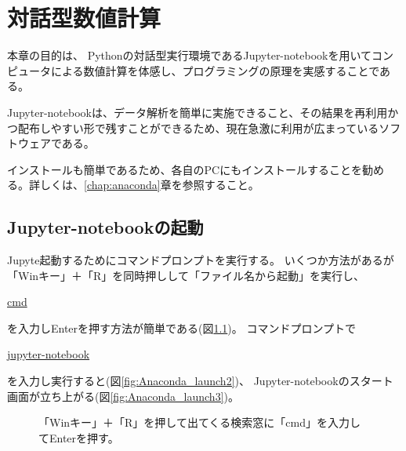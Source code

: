 \chapter{対話型数値計算}

本章の目的は、
Pythonの対話型実行環境であるJupyter-notebookを用いてコンピュータによる数値計算を体感し、プログラミングの原理を実感することである。

Jupyter-notebookは、データ解析を簡単に実施できること、その結果を再利用かつ配布しやすい形で残すことができるため、現在急激に利用が広まっているソフトウェアである。

インストールも簡単であるため、各自のPCにもインストールすることを勧める。詳しくは、\ref{chap:anaconda}章を参照すること。

\section{Jupyter-notebookの起動}
Jupyte起動するためにコマンドプロンプトを実行する。
いくつか方法があるが「Winキー」＋「R」を同時押しして「ファイル名から起動」を実行し、

\url{cmd}

\noindent を入力しEnterを押す方法が簡単である(図\ref{fig:Anaconda_launch1})。
コマンドプロンプトで

\url{jupyter-notebook}

\noindent を入力し実行すると(図\ref{fig:Anaconda_launch2})、
Jupyter-notebookのスタート画面が立ち上がる(図\ref{fig:Anaconda_launch3})。
　
\begin{figure}[htbp]
	\centering
	\caption{
		\label{fig:Anaconda_launch1}
		「Winキー」＋「R」を押して出てくる検索窓に「cmd」を入力してEnterを押す。
			}
\end{figure}

